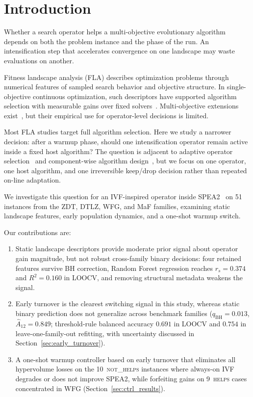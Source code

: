 \documentclass[runningheads]{llncs}
\begin{document}
\section{Introduction}
\label{sec:intro}

Whether a search operator helps a multi-objective evolutionary algorithm
depends on both the problem instance and the phase of the run. An
intensification step that accelerates convergence on one landscape may waste
evaluations on another.

Fitness landscape analysis (FLA) describes optimization problems through
numerical features of sampled search behavior and objective structure. In
single-objective continuous optimization, such descriptors have supported
algorithm selection with measurable gains over fixed
solvers~\cite{mersmann2011exploratory,kerschke2019automated,bischl2016aslib}.
Multi-objective extensions exist~\cite{liefooghe2018landscape}, but their
empirical use for operator-level decisions is limited.

Most FLA studies target full algorithm selection. Here we study a narrower
decision: after a warmup phase, should one intensification operator remain
active inside a fixed host algorithm? The question is adjacent to adaptive
operator selection~\cite{fialho2008adaptive,maturana2009adaptive} and
component-wise algorithm design~\cite{bezerra2016automatic}, but we focus on
one operator, one host algorithm, and one irreversible keep/drop decision
rather than repeated on-line adaptation.

We investigate this question for an IVF-inspired operator inside
SPEA2~\cite{zitzler2001spea2} on 51 instances from the ZDT, DTLZ, WFG, and
MaF families, examining static landscape features, early population dynamics,
and a one-shot warmup switch.

Our contributions are:
\begin{enumerate}
	\item Static landscape descriptors provide moderate prior signal about
	      operator gain magnitude, but not robust cross-family binary
	      decisions: four retained features survive BH correction, Random
	      Forest regression reaches $r_s\!=\!0.374$ and $R^{2}\!=\!0.160$ in
	      LOOCV, and removing structural metadata weakens the signal.
	\item Early turnover is the clearest switching signal in this study,
	      whereas static binary prediction does not generalize across
	      benchmark families
	      ($q_{\mathrm{BH}}\!=\!0.013$, $\hat{A}_{12}\!=\!0.849$; threshold-rule
	      balanced accuracy $0.691$ in LOOCV and $0.754$ in leave-one-family-out
	      refitting, with uncertainty discussed in
	      Section~\ref{sec:early_turnover}).
	\item A one-shot warmup controller based on early turnover that
	      eliminates all hypervolume losses on the 10~\textsc{not\_helps}
	      instances where always-on IVF degrades or does not improve SPEA2,
	      while forfeiting gains on 9~\textsc{helps} cases concentrated in
	      WFG (Section~\ref{sec:ctrl_results}).
\end{enumerate}
\end{document}
